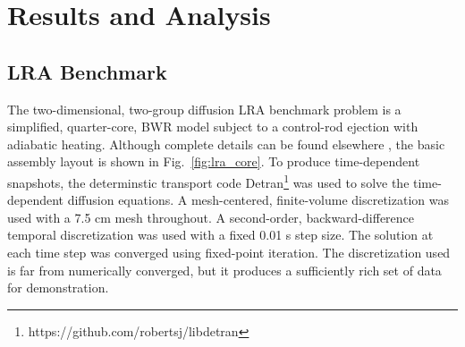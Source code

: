 \documentclass{anstrans}
\begin{document}
\section{Results and Analysis}
\label{sec:application}

\subsection{LRA Benchmark}

The two-dimensional, two-group diffusion LRA benchmark problem is a simplified, quarter-core, BWR model subject to a control-rod ejection with adiabatic heating.
Although complete details can be found elsewhere \cite{anl}, the basic assembly layout is shown in Fig.~\ref{fig:lra_core}.
To produce time-dependent snapshots, the determinstic transport code Detran\footnote{https://github.com/robertsj/libdetran} was used to solve the time-dependent diffusion equations.  
A mesh-centered, finite-volume discretization was used with a 7.5 cm mesh throughout.
A second-order, backward-difference temporal discretization was used with a fixed 0.01 s step size.  
The solution at each time step was converged using fixed-point iteration.
The discretization used is far from numerically converged, but it produces a sufficiently rich set of data for demonstration.
\end{document}
